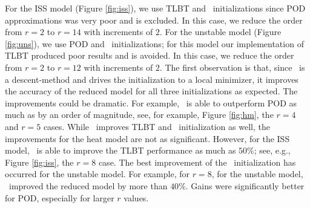 \documentclass[twocolumn]{autart}
\begin{document}
  
  
   For the ISS model (Figure \ref{fig:iss}), we use  TLBT and \goyal \ initializations since  POD approximations was very poor and  is excluded. In this case, we reduce the order from $r=2$ to $r=14$ with increments of $2$. For the unstable model (Figure \ref{fig:uns}), we use POD and \goyal \ initializations; for this model our implementation of TLBT produced  poor results and is avoided. In this case,  we reduce the order from $r=2$ to $r=12$ with increments of $2$.  
 The first observation is that,  since  \FH \ is a descent-method and drives the initialization to a local minimizer,  it improves the accuracy of  the reduced model for all three initializations as expected. The improvements could be dramatic. For example, 
 \FH \ is able to outperform POD as much as by an order of magnitude, see, for example,
 Figure \ref{fig:hm}, the  $r=4$ and $r=5$ cases. 
 While \FH \ improves TLBT and \goyal\ initialization as well, the improvements for the heat model are not as significant. However, for the ISS model,
\FH \ is able to improve the TLBT performance as much as $50\%$; see, e.g., Figure \ref{fig:iss}, the $r=8$ case. 
The best improvement of the \goyal \ initialization has occurred for the unstable model. For example, for $r=8$, for the unstable model, \FH\ improved the reduced model by more than $40 \%$. Gains were significantly better for POD, especially for larger $r$ values. 
\end{document}
